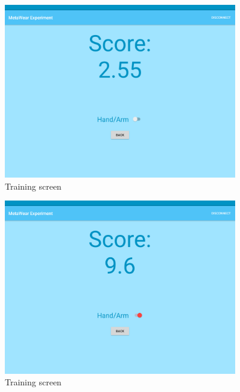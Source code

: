 \begin{figure}[h!]
\centering
\includegraphics[width=0.9\textwidth]{figures/tablet_screen3.png}
\caption{Training screen}
\label{appendix_app_screen_3}
\end{figure}

\begin{figure}[h!]
\centering
\includegraphics[width=0.9\textwidth]{figures/tablet_screen4.png}
\caption{Training screen}
\label{appendix_app_screen_4}
\end{figure}

